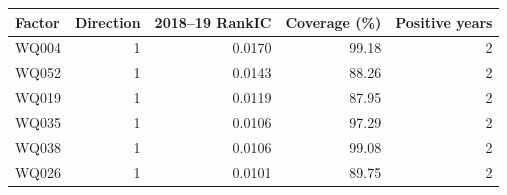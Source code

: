 \begin{tabular}{lrrrr}
\toprule
Factor & Direction & 2018--19 RankIC & Coverage (\%) & Positive years \\
\midrule
WQ004 & 1 & 0.0170 & 99.18 & 2 \\
WQ052 & 1 & 0.0143 & 88.26 & 2 \\
WQ019 & 1 & 0.0119 & 87.95 & 2 \\
WQ035 & 1 & 0.0106 & 97.29 & 2 \\
WQ038 & 1 & 0.0106 & 99.08 & 2 \\
WQ026 & 1 & 0.0101 & 89.75 & 2 \\
\bottomrule
\end{tabular}
